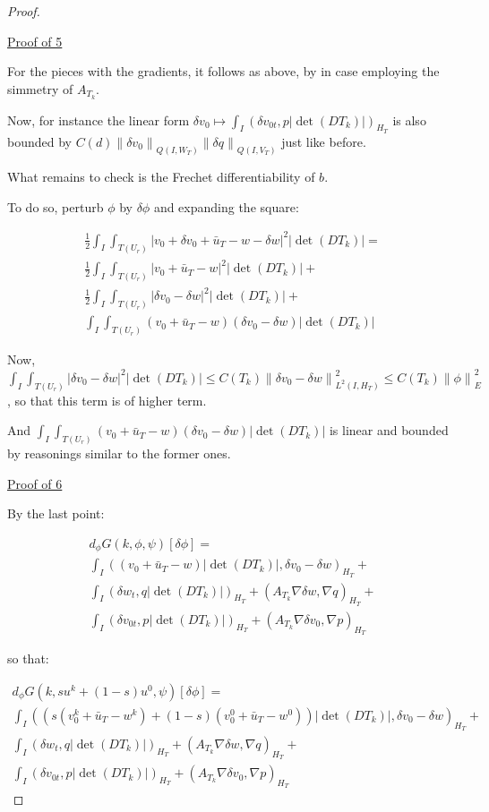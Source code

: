\documentclass[english,a4paper,12pt,oneside]{scrbook}
\theoremstyle{break}
\newenvironment{mproof}[1][\proofname]{%
  \begin{proof}[#1]$ $\par\nobreak\ignorespaces
}{%
  \end{proof}
}
\renewcommand*{\proofname}{Proof}
\theoremstyle{remark}
\newcommand{\ds}{\displaystyle}
\newcommand{\norm}[1]{\left\lVert#1\right\rVert}
\begin{document}
\begin{mproof}
\underline{Proof of 5}

For the pieces with the gradients, it follows as above, by in case employing the simmetry of $A_{T_k}$.

Now, for instance the linear form $\delta v_0 \mapsto \int_I (\delta v_{0t},p |\det(DT_k)|)_{H_T}$ is also bounded by $C(d) \norm{\delta v_0}_{Q(I,W_T)}\norm{\delta q}_{Q(I,V_T)}$ just like before.

What remains to check is the Frechet differentiability of $b$.

To do so, perturb $\phi$ by $\delta \phi$ and expanding the square:

\begin{align*}
\frac{1}{2}\int_I \int_{T(U_r)}|v_0+\delta v_0+\bar{u}_T - w-\delta w|^2|\det(DT_k)| = \\\frac{1}{2}\int_I \int_{T(U_r)}|v_0+\bar{u}_T - w|^2|\det(DT_k)|+\\\frac{1}{2}\int_I \int_{T(U_r)}|\delta v_0-\delta w|^2|\det(DT_k)|+\\\int_I \int_{T(U_r)}(v_0+\bar{u}_T - w)(\delta v_0-\delta w)|\det(DT_k)|
\end{align*} 

Now, $\ds \int_I \int_{T(U_r)}|\delta v_0-\delta w|^2|\det(DT_k)|\leq C(T_k)\norm{\delta v_0-\delta w}_{L^2(I,H_T)}^2\leq C(T_k)\norm{\phi}_E^2$, so that this term is of higher term.

And $\int_I \int_{T(U_r)}(v_0+\bar{u}_T - w)(\delta v_0-\delta w)|\det(DT_k)|$ is linear and bounded by reasonings similar to the former ones.

\underline{Proof of 6}

By the last point:

\begin{align*}
d_\phi G(k, \phi ,\psi)[\delta \phi] =\\
\int_I ((v_0+\bar{u}_T - w)|\det(DT_k)|,\delta v_0-\delta w)_{H_T}+\\
\int_I (\delta w_t , q |\det(DT_k)|)_{H_T}+ (A_{T_k}\nabla \delta w, \nabla q)_{H_T}+\\
\int_I (\delta v_{0t},p |\det(DT_k)|)_{H_T} + (A_{T_k} \nabla \delta v_0, \nabla p)_{H_T}
\end{align*}

so that:

\begin{align*}
d_\phi G(k, su^k + (1-s)u^0,\psi)[\delta \phi] = \\
\int_I ((s(v_0^k+\bar{u}_T - w^k)+(1-s)(v_0^0+\bar{u}_T - w^0))|\det(DT_k)|,\delta v_0-\delta w)_{H_T}+\\
\int_I ( \delta w_t , q |\det(DT_k)|)_{H_T}+ (A_{T_k}\nabla \delta w, \nabla q)_{H_T}+\\
\int_I ( \delta v_{0t},p |\det(DT_k)|)_{H_T} + (A_{T_k} \nabla \delta v_0, \nabla p)_{H_T}
\end{align*}


\end{mproof}
\end{document}
